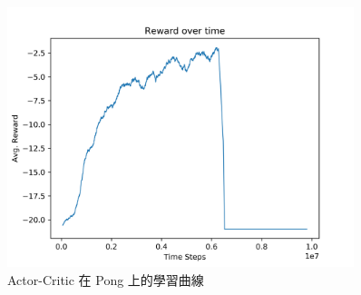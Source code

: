 \documentclass[fleqn,a4paper,12pt]{article}
\begin{document}
\begin{figure}[h]
  \centering
  \includegraphics[width=0.9\textwidth]{figures/actor-critic.png}
  \caption{Actor-Critic 在 Pong 上的學習曲線}
  \label{fig:learning-curve-actor-critic}
\end{figure}
\end{document}
